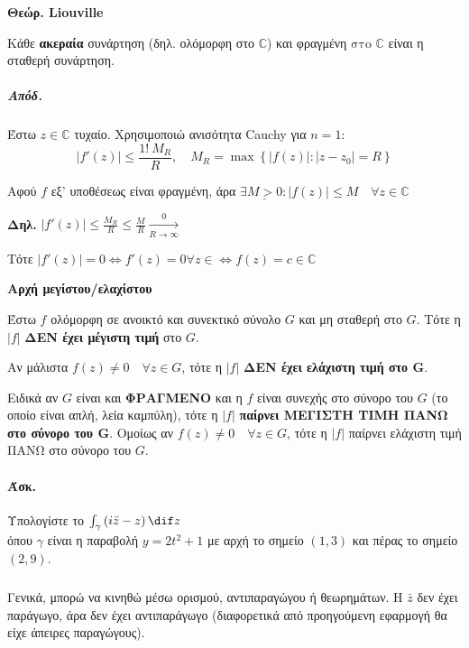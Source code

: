 \documentclass[12pt,a4paper,notitlepage,fleqn]{article}
\begin{document}
\begin{enumparen}
    	\item \textbf{Θεώρ. Liouville}

    	Κάθε \textbf{ακεραία} συνάρτηση (δηλ. ολόμορφη στο \( \mathbb C  \)) και φραγμένη
    	\( \boxed{\text{στο } \mathbb C}  \) είναι η σταθερή συνάρτηση.
    	\subparagraph{Απόδ.}
    	Έστω \( z \in \mathbb C  \) τυχαίο. Χρησιμοποιώ ανισότητα Cauchy για \( n=1 \):
    	\[
    	\left|f'(z)\right| \leq \frac{1!\ M_R}{R},\quad M_R = \max
    	\left\lbrace \left|f(z)\right|: |z-z_0|=R \right\rbrace
    	\]

    	Αφού \( f \) εξ' υποθέσεως είναι φραγμένη, άρα \( \exists \underline{M > 0}:
    	\left|f(z)\right| \leq M \quad \forall z \in \mathbb C
    	 \)

    	\textbf{Δηλ.} \(  \displaystyle
    	\left|f'(z)\right| \leq \frac{M_R}{R} \leq \frac{M}{R}
    	\xrightarrow[R\to \infty] 0
    	 \)

        Τότε \( \left|f'(z)\right| = 0 \iff f'(z)=0 \forall z\in
        \iff f(z) = c\in\mathbb C
        \)

        \item \textbf{Αρχή μεγίστου/ελαχίστου}

        Έστω \( f \) ολόμορφη σε ανοικτό και συνεκτικό σύνολο \( G \) και μη σταθερή στο
        \( G \). Τότε η \( |f| \) \textbf{ΔΕΝ έχει μέγιστη τιμή} στο \( G \).

        Αν μάλιστα \( f(z) \neq 0 \quad \forall z \in G \), τότε η \( |f| \)
        \textbf{ΔΕΝ έχει ελάχιστη τιμή στο \( \mathbf G \)}.

        Ειδικά αν \( G \) είναι και \textbf{ΦΡΑΓΜΕΝΟ} και η \( f \) είναι συνεχής στο
        σύνορο του \( G \) (το οποίο είναι απλή, λεία καμπύλη), τότε η \( |f| \)
        \textbf{παίρνει ΜΕΓΙΣΤΗ ΤΙΜΗ ΠΑΝΩ στο σύνορο του \( \mathbf G \)}.
        Ομοίως αν \( f(z) \neq 0 \quad \forall z \in G \), τότε η \( |f| \)
        παίρνει ελάχιστη τιμή ΠΑΝΩ στο σύνορο του \( G \).

    \end{enumparen}

    \paragraph{Άσκ.} Υπολογίστε το \( \int_\gamma \left( i\bar z - z \right)\dif z \)
    \\ όπου \( \gamma \) είναι η παραβολή \( y=2t^2+1 \) με αρχή το σημείο \( (1,3) \)
    και πέρας το σημείο \( (2,9) \).
    \subparagraph{}
    Γενικά, μπορώ να κινηθώ μέσω ορισμού, αντιπαραγώγου ή θεωρημάτων. Η \( \bar z \)
    δεν έχει παράγωγο, άρα δεν έχει αντιπαράγωγο (διαφορετικά από προηγούμενη εφαρμογή
    θα είχε άπειρες παραγώγους).
\end{document}
